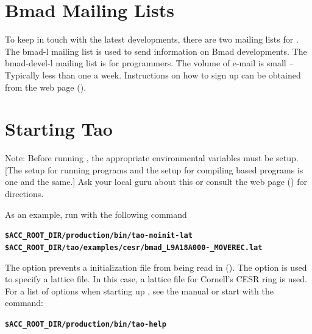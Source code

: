 \documentclass{hitec}
\newcommand{\BF}[1]{{\normalfont\textbf{#1}}}
\newenvironment{display}
  {\vspace*{-1.5ex} \begin{alltt}}
  {\end{alltt} \vspace*{-1.0ex}}
\begin{document}
\section{Bmad Mailing Lists}

To keep in touch with the latest \bmad developments, there are two mailing lists for
\bmad.  The bmad-l mailing list is used to send information on Bmad developments.  The
bmad-devel-l mailing list is for programmers. The volume of e-mail is small -- Typically
less than one a week. Instructions on how to sign up can be obtained from the \bmad web
page ().

\section{Starting Tao}
\label{s:starting.tao}

Note: Before running \tao, the appropriate environmental variables must be setup.
[The setup for running programs and the setup for compiling \bmad based programs is one
and the same.] Ask your local \bmad guru about this or consult the \bmad web page
() for directions.

As an example, run \tao with the following command
\begin{display}
  \BF{\$ACC_ROOT_DIR/production/bin/tao -noinit -lat \B
              \$ACC_ROOT_DIR/tao/examples/cesr/bmad_L9A18A000-_MOVEREC.lat}
\end{display}
The  option prevents a \tao initialization file from being read in
(). The  option is used to specify a lattice file. In this case,
a lattice file for Cornell's CESR ring is used. For a list of options when starting up
\tao, see the \tao manual or start \tao with the command:
\begin{display}
  \BF{\$ACC_ROOT_DIR/production/bin/tao -help}
\end{display}
\end{document}
